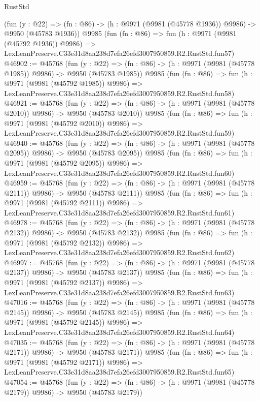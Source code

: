 \begin{lexlean}{RustStd}
\begin{coremodule}
    (fun (y : @22) =>
    (fn : @86) -> (h : @9971 (@9981 (@45778 @1936)) @9986) -> @9950 (@45783 @1936))
    @9985
    (fun (fn : @86) =>
    fun (h : @9971 (@9981 (@45792 @1936)) @9986) =>
    LexLeanPreserve.C33e31d8aa238d7efa26efd3007950859.R2.RustStd.fun57)
@46902 := @45768
    (fun (y : @22) =>
    (fn : @86) -> (h : @9971 (@9981 (@45778 @1985)) @9986) -> @9950 (@45783 @1985))
    @9985
    (fun (fn : @86) =>
    fun (h : @9971 (@9981 (@45792 @1985)) @9986) =>
    LexLeanPreserve.C33e31d8aa238d7efa26efd3007950859.R2.RustStd.fun58)
@46921 := @45768
    (fun (y : @22) =>
    (fn : @86) -> (h : @9971 (@9981 (@45778 @2010)) @9986) -> @9950 (@45783 @2010))
    @9985
    (fun (fn : @86) =>
    fun (h : @9971 (@9981 (@45792 @2010)) @9986) =>
    LexLeanPreserve.C33e31d8aa238d7efa26efd3007950859.R2.RustStd.fun59)
@46940 := @45768
    (fun (y : @22) =>
    (fn : @86) -> (h : @9971 (@9981 (@45778 @2095)) @9986) -> @9950 (@45783 @2095))
    @9985
    (fun (fn : @86) =>
    fun (h : @9971 (@9981 (@45792 @2095)) @9986) =>
    LexLeanPreserve.C33e31d8aa238d7efa26efd3007950859.R2.RustStd.fun60)
@46959 := @45768
    (fun (y : @22) =>
    (fn : @86) -> (h : @9971 (@9981 (@45778 @2111)) @9986) -> @9950 (@45783 @2111))
    @9985
    (fun (fn : @86) =>
    fun (h : @9971 (@9981 (@45792 @2111)) @9986) =>
    LexLeanPreserve.C33e31d8aa238d7efa26efd3007950859.R2.RustStd.fun61)
@46978 := @45768
    (fun (y : @22) =>
    (fn : @86) -> (h : @9971 (@9981 (@45778 @2132)) @9986) -> @9950 (@45783 @2132))
    @9985
    (fun (fn : @86) =>
    fun (h : @9971 (@9981 (@45792 @2132)) @9986) =>
    LexLeanPreserve.C33e31d8aa238d7efa26efd3007950859.R2.RustStd.fun62)
@46997 := @45768
    (fun (y : @22) =>
    (fn : @86) -> (h : @9971 (@9981 (@45778 @2137)) @9986) -> @9950 (@45783 @2137))
    @9985
    (fun (fn : @86) =>
    fun (h : @9971 (@9981 (@45792 @2137)) @9986) =>
    LexLeanPreserve.C33e31d8aa238d7efa26efd3007950859.R2.RustStd.fun63)
@47016 := @45768
    (fun (y : @22) =>
    (fn : @86) -> (h : @9971 (@9981 (@45778 @2145)) @9986) -> @9950 (@45783 @2145))
    @9985
    (fun (fn : @86) =>
    fun (h : @9971 (@9981 (@45792 @2145)) @9986) =>
    LexLeanPreserve.C33e31d8aa238d7efa26efd3007950859.R2.RustStd.fun64)
@47035 := @45768
    (fun (y : @22) =>
    (fn : @86) -> (h : @9971 (@9981 (@45778 @2171)) @9986) -> @9950 (@45783 @2171))
    @9985
    (fun (fn : @86) =>
    fun (h : @9971 (@9981 (@45792 @2171)) @9986) =>
    LexLeanPreserve.C33e31d8aa238d7efa26efd3007950859.R2.RustStd.fun65)
@47054 := @45768
    (fun (y : @22) =>
    (fn : @86) -> (h : @9971 (@9981 (@45778 @2179)) @9986) -> @9950 (@45783 @2179))

\end{coremodule}
\end{lexlean}
